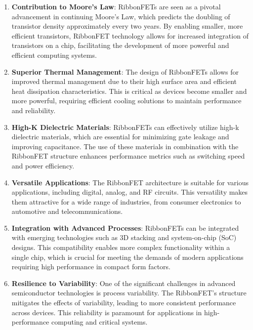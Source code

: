 \documentclass[12pt]{report}
\begin{document}
\begin{titlepage}
\begin{enumerate}
    \item \textbf{Contribution to Moore's Law}: RibbonFETs are seen as a pivotal advancement in continuing Moore's Law, which predicts the doubling of transistor density approximately every two years. By enabling smaller, more efficient transistors, RibbonFET technology allows for increased integration of transistors on a chip, facilitating the development of more powerful and efficient computing systems.

    \item \textbf{Superior Thermal Management}: The design of RibbonFETs allows for improved thermal management due to their high surface area and efficient heat dissipation characteristics. This is critical as devices become smaller and more powerful, requiring efficient cooling solutions to maintain performance and reliability.

    \item \textbf{High-K Dielectric Materials}: RibbonFETs can effectively utilize high-k dielectric materials, which are essential for minimizing gate leakage and improving capacitance. The use of these materials in combination with the RibbonFET structure enhances performance metrics such as switching speed and power efficiency.

    \item \textbf{Versatile Applications}: The RibbonFET architecture is suitable for various applications, including digital, analog, and RF circuits. This versatility makes them attractive for a wide range of industries, from consumer electronics to automotive and telecommunications.

    \item \textbf{Integration with Advanced Processes}: RibbonFETs can be integrated with emerging technologies such as 3D stacking and system-on-chip (SoC) designs. This compatibility enables more complex functionality within a single chip, which is crucial for meeting the demands of modern applications requiring high performance in compact form factors.

    \item \textbf{Resilience to Variability}: One of the significant challenges in advanced semiconductor technologies is process variability. The RibbonFET's structure mitigates the effects of variability, leading to more consistent performance across devices. This reliability is paramount for applications in high-performance computing and critical systems.


\end{enumerate}
\end{titlepage}
\end{document}
